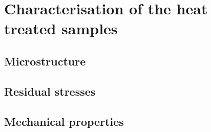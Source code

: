 \section{Characterisation of the heat treated samples}

\subsection{Microstructure}

 
\subsection{Residual stresses}

\subsection{Mechanical properties}

